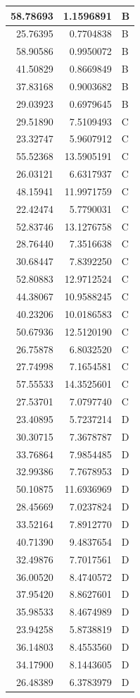 \documentclass[
  letterpaper,
  DIV=11,
  numbers=noendperiod]{scrartcl}
\begin{document}
\begin{table}
\begin{tabular}[t]{r|r|l}
\hline
58.78693 & 1.1596891 & B\\
\hline
25.76395 & 0.7704838 & B\\
\hline
58.90586 & 0.9950072 & B\\
\hline
41.50829 & 0.8669849 & B\\
\hline
37.83168 & 0.9003682 & B\\
\hline
29.03923 & 0.6979645 & B\\
\hline
29.51890 & 7.5109493 & C\\
\hline
23.32747 & 5.9607912 & C\\
\hline
55.52368 & 13.5905191 & C\\
\hline
26.03121 & 6.6317937 & C\\
\hline
48.15941 & 11.9971759 & C\\
\hline
22.42474 & 5.7790031 & C\\
\hline
52.83746 & 13.1276758 & C\\
\hline
28.76440 & 7.3516638 & C\\
\hline
30.68447 & 7.8392250 & C\\
\hline
52.80883 & 12.9712524 & C\\
\hline
44.38067 & 10.9588245 & C\\
\hline
40.23206 & 10.0186583 & C\\
\hline
50.67936 & 12.5120190 & C\\
\hline
26.75878 & 6.8032520 & C\\
\hline
27.74998 & 7.1654581 & C\\
\hline
57.55533 & 14.3525601 & C\\
\hline
27.53701 & 7.0797740 & C\\
\hline
23.40895 & 5.7237214 & D\\
\hline
30.30715 & 7.3678787 & D\\
\hline
33.76864 & 7.9854485 & D\\
\hline
32.99386 & 7.7678953 & D\\
\hline
50.10875 & 11.6936969 & D\\
\hline
28.45669 & 7.0237824 & D\\
\hline
33.52164 & 7.8912770 & D\\
\hline
40.71390 & 9.4837654 & D\\
\hline
32.49876 & 7.7017561 & D\\
\hline
36.00520 & 8.4740572 & D\\
\hline
37.95420 & 8.8627601 & D\\
\hline
35.98533 & 8.4674989 & D\\
\hline
23.94258 & 5.8738819 & D\\
\hline
36.14803 & 8.4553560 & D\\
\hline
34.17900 & 8.1443605 & D\\
\hline
26.48389 & 6.3783979 & D\\
\hline
\end{tabular}
\end{table}
\end{document}
